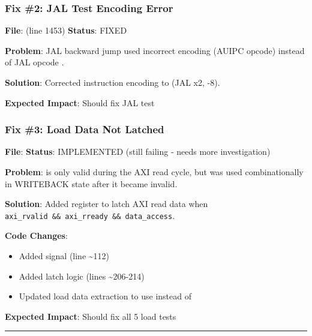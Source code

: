 \subsubsection{Fix \#2: JAL Test Encoding Error}\label{cr:fix:rtl-bug-fixes:fix-2-jal-test-encoding-error}

\begin{record}

\textbf{File}:  (line 1453)
\textbf{Status}: \ok{} FIXED

\textbf{Problem}: JAL backward jump used incorrect encoding
 (AUIPC opcode) instead of JAL opcode .

\textbf{Solution}: Corrected instruction encoding to 
(JAL x2, -8).

\textbf{Expected Impact}: Should fix JAL test

\end{record}

\subsubsection{Fix \#3: Load Data Not Latched}\label{cr:fix:rtl-bug-fixes:fix-3-load-data-not-latched}

\begin{record}

\textbf{File}:  \textbf{Status}: \ok{}
IMPLEMENTED (still failing - needs more investigation)

\textbf{Problem}:  is only valid during the AXI read
cycle, but was used combinationally in WRITEBACK state after it became
invalid.

\textbf{Solution}: Added  register to latch AXI read
data when
\texttt{axi\_\allowbreak{}rvalid\ \&\&\ axi\_\allowbreak{}rready\ \&\&\ data\_\allowbreak{}access}.

\textbf{Code Changes}:

\begin{itemize}
\tightlist
\item
  Added  signal (line \textasciitilde112)
\item
  Added latch logic (lines \textasciitilde206-214)
\item
  Updated load data extraction to use  instead of
\end{itemize}

\textbf{Expected Impact}: Should fix all 5 load tests

\begin{center}\rule{0.5\linewidth}{0.5pt}\end{center}

\end{record}

